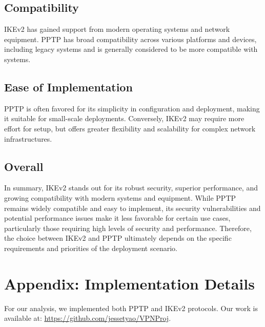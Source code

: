 \documentclass[runningheads]{llncs}
\begin{document}
\subsection{Compatibility}
IKEv2 has gained support from modern operating systems and network equipment. PPTP has broad compatibility across various platforms and devices, including legacy systems and is generally considered to be more compatible with systems.
\subsection{Ease of Implementation}
PPTP is often favored for its simplicity in configuration and deployment, making it suitable for small-scale deployments. Conversely, IKEv2 may require more effort for setup, but offers greater flexibility and scalability for complex network infrastructures.
\subsection{Overall}
In summary, IKEv2 stands out for its robust security, superior performance, and growing compatibility with modern systems and equipment. While PPTP remains widely compatible and easy to implement, its security vulnerabilities and potential performance issues make it less favorable for certain use cases, particularly those requiring high levels of security and performance. Therefore, the choice between IKEv2 and PPTP ultimately depends on the specific requirements and priorities of the deployment scenario.
\section{Appendix: Implementation Details}
For our analysis, we implemented both PPTP and IKEv2 protocols. Our work is available at:
\underline{\url{https://github.com/jessetyao/VPNProj}}.

\newpage



\end{document}
